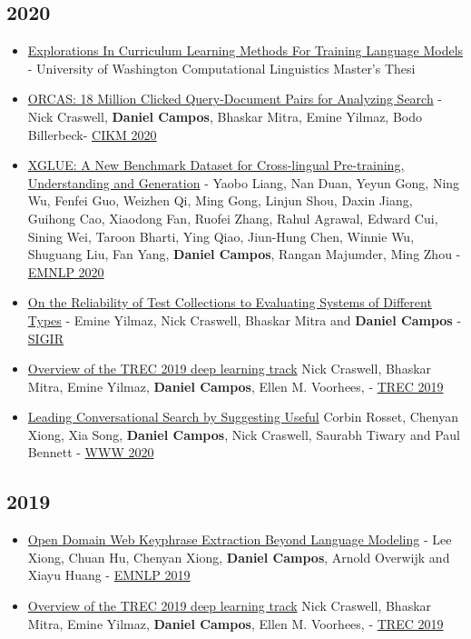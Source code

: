 \documentclass[line,margin]{res}
\begin{document}
\begin{resume}
\subsection{2020}
\begin{itemize}
\itemsep -2pt
    \item \href{https://spacemanidol.github.io/cv/UWTHESIS.pdf}{Explorations In Curriculum Learning Methods For Training Language Models} - University of Washington Computational Linguistics Master's Thesi
    \item \href{https://arxiv.org/abs/2006.05324}{ORCAS: 18 Million Clicked Query-Document Pairs for Analyzing Search} - Nick Craswell, \textbf{Daniel Campos}, Bhaskar Mitra, Emine Yilmaz, Bodo Billerbeck- \href{https://www.cikm2020.org/}{CIKM 2020}
    \item \href{https://arxiv.org/abs/2004.01401}{XGLUE: A New Benchmark Dataset for Cross-lingual Pre-training, Understanding and Generation} - Yaobo Liang, Nan Duan, Yeyun Gong, Ning Wu, Fenfei Guo, Weizhen Qi, Ming Gong, Linjun Shou, Daxin Jiang, Guihong Cao, Xiaodong Fan, Ruofei Zhang, Rahul Agrawal, Edward Cui, Sining Wei, Taroon Bharti, Ying Qiao, Jiun-Hung Chen, Winnie Wu, Shuguang Liu, Fan Yang, \textbf{Daniel Campos}, Rangan Majumder, Ming Zhou - \href{https://2020.emnlp.org/}{EMNLP 2020}
    \item \href{https://arxiv.org/pdf/2004.13486.pdf}{On the Reliability of Test Collections to Evaluating Systems of Different Types} - Emine Yilmaz, Nick Craswell, Bhaskar Mitra and \textbf{Daniel Campos} - \href{https://sigir.org/sigir2020/}{SIGIR} 
    \item \href{https://arxiv.org/abs/2003.07820}{Overview of the TREC 2019 deep learning track} Nick Craswell, Bhaskar Mitra, Emine Yilmaz, \textbf{Daniel Campos}, Ellen M. Voorhees, - \href{https://trec.nist.gov/tracks.html}{TREC 2019}
	\item \href{https://www.microsoft.com/en-us/research/publication/leading-conversational-search-by-suggesting-useful-questions/}{Leading Conversational Search by Suggesting Useful} Corbin Rosset, Chenyan Xiong, Xia Song, \textbf{Daniel Campos}, Nick Craswell, Saurabh Tiwary and Paul Bennett - \href{https://www2020.thewebconf.org/}{WWW 2020}
\end{itemize}
\subsection{2019}
    \begin{itemize}
    \itemsep -5pt
    \item \href{https://arxiv.org/abs/1911.02671}{Open Domain Web Keyphrase Extraction Beyond Language Modeling} - Lee Xiong, Chuan Hu, Chenyan Xiong, \textbf{Daniel Campos}, Arnold Overwijk and Xiayu Huang - \href{https://www.emnlp-ijcnlp2019.org/}{EMNLP 2019}
    \item \href{https://arxiv.org/abs/2003.07820}{Overview of the TREC 2019 deep learning track} Nick Craswell, Bhaskar Mitra, Emine Yilmaz, \textbf{Daniel Campos}, Ellen M. Voorhees, - \href{https://trec.nist.gov/tracks.html}{TREC 2019}
    \end{itemize}

\end{resume}
\end{document}
